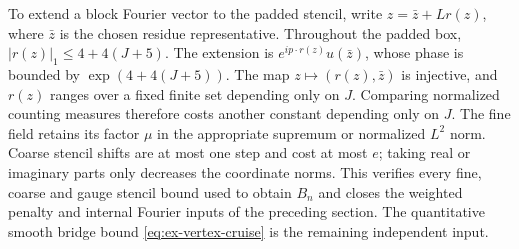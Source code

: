 To extend a block Fourier vector to the padded stencil, write
$z=\bar z+Lr(z)$, where $\bar z$ is the chosen residue representative.
Throughout the padded box, $|r(z)|_1\leq4+4(J+5)$.
The extension is $e^{ip\cdot r(z)}u(\bar z)$, whose phase is bounded by
$\exp(4+4(J+5))$. The map $z\mapsto(r(z),\bar z)$ is injective, and
$r(z)$ ranges over a fixed finite set depending only on $J$. Comparing
normalized counting measures therefore costs another constant depending
only on $J$. The fine field retains its factor $\mu$ in the appropriate
supremum or normalized $L^2$ norm. Coarse stencil shifts are at most one
step and cost at most $e$; taking real or imaginary parts only decreases
the coordinate norms. This verifies every fine, coarse and gauge stencil
bound used to obtain $B_n$ and closes the weighted penalty and internal
Fourier inputs of the preceding section. The quantitative smooth bridge
bound \eqref{eq:ex-vertex-cruise} is the remaining independent input.
